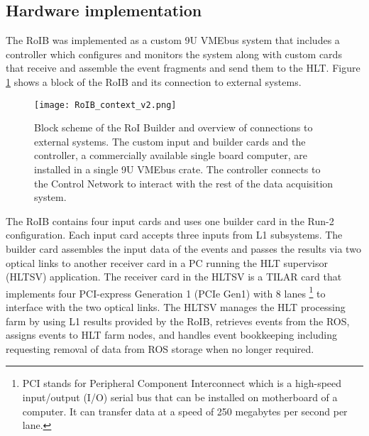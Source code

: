 \subsection{Hardware implementation}\label{sec:roib_current}

The RoIB was implemented as a custom 9U VMEbus system that includes a controller which configures and monitors the system along with custom cards 
that receive and assemble the event fragments and send them to the HLT. Figure \ref{roib_run1} shows a block of the RoIB and 
its connection to external systems.

\begin{figure}[tbp] %
\centering
\texttt{[image: RoIB\_context\_v2.png]}
\caption{Block scheme of the RoI Builder and overview of connections to external systems.  The
custom input and builder cards and the controller, a commercially available single board computer,
are installed in a single 9U VMEbus crate. The controller connects to the Control Network to interact with the rest of the 
data acquisition system.}
\label{roib_run1}
\end{figure}

The RoIB contains four input cards and uses one builder card in the Run-2 configuration. Each input card accepts three inputs from 
L1 subsystems. 
The builder card assembles the input data of the events and passes the results via two optical links 
to another receiver card in a PC running the HLT supervisor (HLTSV) application. The receiver card in the HLTSV is a TILAR card \cite{tilar}
 that implements four PCI-express Generation 1 (PCIe Gen1) with 8 lanes
\footnote{PCI stands for Peripheral Component Interconnect which is 
a high-speed input/output (I/O) serial bus that can be installed on
motherboard of a computer.
It can transfer data at a speed of 250 megabytes per second per lane.
}
 to interface with the two optical links. The HLTSV manages the HLT processing farm by using L1 results provided by the RoIB, retrieves events from the ROS, assigns events to HLT farm nodes, and handles event bookkeeping including requesting removal of data from ROS storage when no longer required. 

